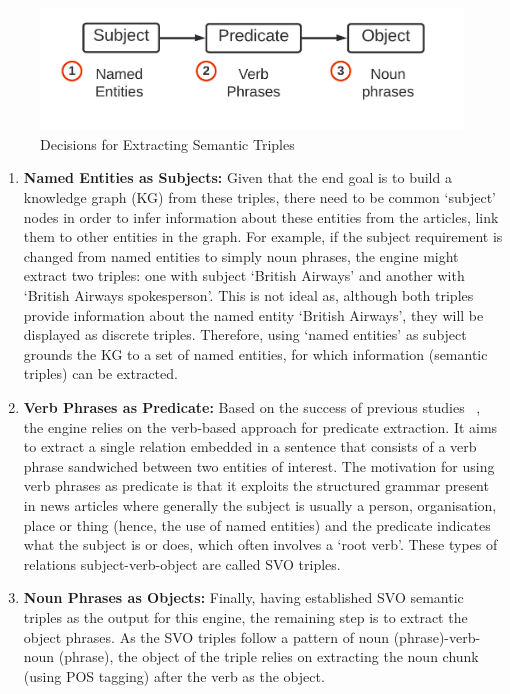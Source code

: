 \begin{figure}[H]
  \centering
  \includegraphics[scale=0.15]{images/relations_kd.png}
  \caption{Decisions for Extracting Semantic Triples}
  \vspace{-1ex}
  \label{fig:rel_key_decisions}
\end{figure}

\begin{enumerate}
  \item \textbf{Named Entities as Subjects:} Given that the end goal is to build a knowledge graph (KG) from these triples, there need to be common `subject' nodes in order to infer information about these entities from the articles, link them to other entities in the graph. For example, if the subject requirement is changed from named entities to simply noun phrases, the engine might extract two triples: one with subject `British Airways' and another with `British Airways spokesperson'. This is not ideal as, although both triples provide information about the named entity `British Airways', they will be displayed as discrete triples. Therefore, using `named entities' as subject grounds the KG to a set of named entities, for which information (semantic triples) can be extracted.
  
  \item \textbf{Verb Phrases as Predicate:} Based on the success of previous studies ~\cite{verb_relation_extraction}, the engine relies on the verb-based approach for predicate extraction. It aims to extract a single relation embedded in a sentence that consists of a verb phrase sandwiched between two entities of interest. The motivation for using verb phrases as predicate is that it exploits the structured grammar present in news articles where generally the subject is usually a person, organisation, place or thing (hence, the use of named entities) and the predicate indicates what the subject is or does, which often involves a `root verb'. These types of relations subject-verb-object are called SVO triples.
  
  \item \textbf{Noun Phrases as Objects:} Finally, having established SVO semantic triples as the output for this engine, the remaining step is to extract the object phrases. As the SVO triples follow a pattern of noun (phrase)-verb-noun (phrase), the object of the triple relies on extracting the noun chunk (using POS tagging) after the verb as the object. 
  
\end{enumerate}

